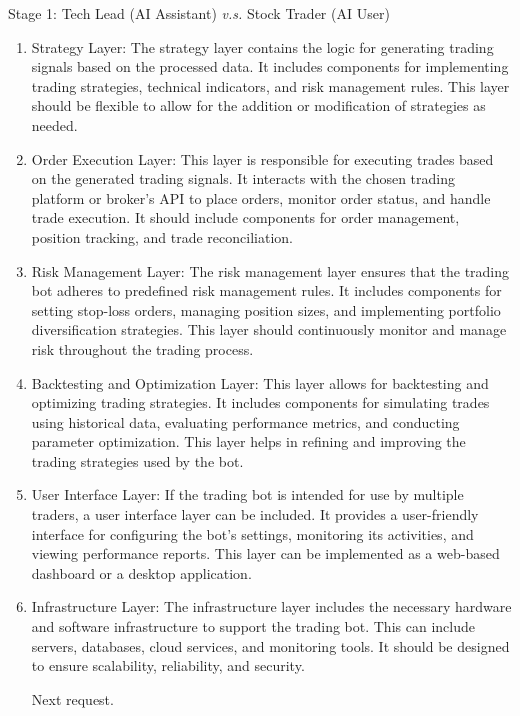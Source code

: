 \begin{AIBoxBreak}{Stage 1: Tech Lead (AI Assistant) \textit{v.s.} Stock Trader (AI User)}
\begin{enumerate}
\item  Strategy Layer: The strategy layer contains the logic for generating trading signals based on the processed data. It includes components for implementing trading strategies, technical indicators, and risk management rules. This layer should be flexible to allow for the addition or modification of strategies as needed.

\item  Order Execution Layer: This layer is responsible for executing trades based on the generated trading signals. It interacts with the chosen trading platform or broker’s API to place orders, monitor order status, and handle trade execution. It should include components for order management, position tracking, and trade reconciliation.

\item  Risk Management Layer: The risk management layer ensures that the trading bot adheres to predefined risk management rules. It includes components for setting stop-loss orders, managing position sizes, and implementing portfolio diversification strategies. This layer should continuously monitor and manage risk throughout the trading process.

\item  Backtesting and Optimization Layer: This layer allows for backtesting and optimizing trading strategies. It includes components for simulating trades using historical data, evaluating performance metrics, and conducting parameter optimization. This layer helps in refining and improving the trading strategies used by the bot.

\item  User Interface Layer: If the trading bot is intended for use by multiple traders, a user interface layer can be included. It provides a user-friendly interface for configuring the bot’s settings, monitoring its activities, and viewing performance reports. This layer can be implemented as a web-based dashboard or a desktop application.

\item  Infrastructure Layer: The infrastructure layer includes the necessary hardware and software infrastructure to support the trading bot. This can include servers, databases, cloud services, and monitoring tools. It should be designed to ensure scalability, reliability, and security.



Next request.
\end{enumerate}



\end{AIBoxBreak}
